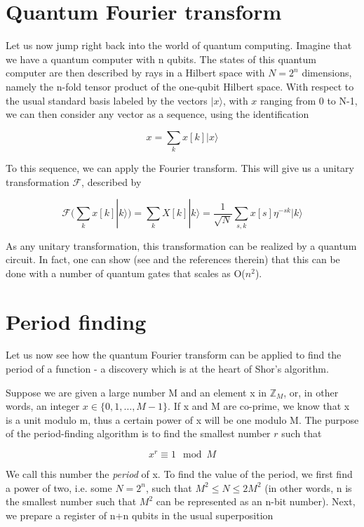 \documentclass[a4paper, draft]{article}
\theoremstyle{own}
\theoremstyle{remark}
\newcommand{\Z}{\mathbb{Z}}
\begin{document}
\section{Quantum Fourier transform}

Let us now jump right back into the world of quantum computing. Imagine that we have a quantum computer with n qubits. The states of this quantum computer are then described by rays in a Hilbert space with $N=2^n$ dimensions, namely the n-fold tensor product of the one-qubit Hilbert space. With respect to the usual standard basis labeled by the vectors $|x \rangle $, with $x$ ranging from 0 to N-1, we can then consider any vector as a sequence, using the identification

$$
x = \sum_k x[k] |x \rangle
$$

To this sequence, we can apply the Fourier transform. This will give us a unitary transformation $\mathcal{F}$, described by

$$
\mathcal{F}(\sum_k x[k] |k \rangle) = \sum_k X[k] |k \rangle 
= \frac{1}{\sqrt{N}} \sum_{s,k} x[s] \eta^{-sk} |k\rangle 
$$

As any unitary transformation, this transformation can be realized by a quantum circuit. In fact, one can show (see \cite{Shor96} and the references therein) that this can be done with a number of quantum gates that scales as O($n^2$). 



\section{Period finding}

Let us now see how the quantum Fourier transform can be applied to find the period of a function - a discovery which is at the heart of Shor's algorithm. 

Suppose we are given a large number M and an element x in $\Z_M$, or, in other words, an integer $x \in \{0, 1, \dots, M-1\}$. If x and M are co-prime, we know that x is a unit modulo m, thus a certain power of x will be one modulo M. The purpose of the period-finding algorithm is to find the smallest number $r$ such that 

$$
x^r \equiv 1 \mod M
$$

We call this number the \emph{period} of x. To find the value of the period, we first find a power of two, i.e. some $N = 2^n$, such that $M^2 \leq N \leq 2M^2$ (in other words, n is the smallest number such that $M^2$ can be represented as an n-bit number). Next, we prepare a register of n+n qubits in the usual superposition
\end{document}
